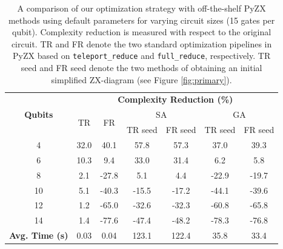 \begin{table}[t]
  \centering
\begin{tabular}{@{}ccccccc@{}}
\toprule
\multirow{3}{*}{\textbf{Qubits}}           & \multicolumn{6}{c}{\textbf{Complexity Reduction (\%)}}                                                      \\ \cmidrule(l){2-7}
                                           & \multirow{2}{*}{TR} & \multirow{2}{*}{FR} & \multicolumn{2}{c}{SA} & \multicolumn{2}{c}{GA} \\ \cmidrule(l){4-7}
                                           &                     &                     & TR seed    & FR seed   & TR seed    & FR seed   \\ \midrule
4                                          & 32.0                & 40.1                & 57.8       & 57.3      & 37.0       & 39.3      \\
6                                          & 10.3                & 9.4                 & 33.0       & 31.4      & 6.2        & 5.8       \\
8                                          & 2.1                 & -27.8               & 5.1        & 4.4       & -22.9      & -19.7     \\
10                                         & 5.1                 & -40.3               & -15.5      & -17.2     & -44.1      & -39.6     \\
12                                         & 1.2                 & -65.0               & -32.6      & -32.3     & -60.8      & -65.8     \\
14                                         & 1.4                 & -77.6               & -47.4      & -48.2     & -78.3      & -76.8     \\ \midrule
\multicolumn{1}{l}{\textbf{Avg. Time (s)}} & 0.03                & 0.04                & 123.1      & 122.4     & 35.8       & 33.4      \\ \bottomrule
\end{tabular}
\caption{\label{tab:init-results}
  A comparison of our optimization strategy with off-the-shelf PyZX methods using default parameters for varying circuit sizes (15 gates per qubit).
  Complexity reduction is measured with respect to the original circuit.
  TR and FR denote the two standard optimization pipelines in PyZX based on {\color{gray}\texttt{teleport\_reduce}} and {\color{gray}\texttt{full\_reduce}}, respectively.
  TR seed and FR seed denote the two methods of obtaining an initial simplified ZX-diagram (see Figure \ref{fig:primary}).
}
\end{table}





